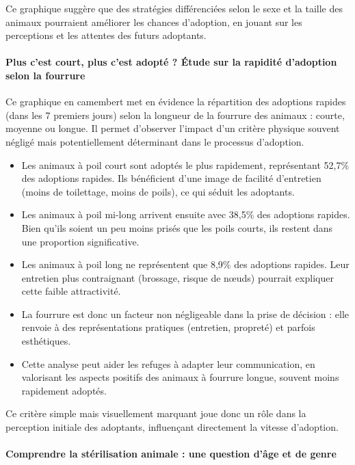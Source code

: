 \documentclass[a4paper,12pt]{article}
\begin{document}
Ce graphique suggère que des stratégies différenciées selon le sexe et la taille des animaux pourraient améliorer les chances d’adoption, en jouant sur les perceptions et les attentes des futurs adoptants.

\paragraph{ Plus c’est court, plus c’est adopté ? Étude sur la rapidité d’adoption selon la fourrure}

Ce graphique en camembert met en évidence la répartition des adoptions rapides (dans les 7 premiers jours) selon la longueur de la fourrure des animaux : courte, moyenne ou longue. Il permet d’observer l’impact d’un critère physique souvent négligé mais potentiellement déterminant dans le processus d’adoption.

\begin{itemize}
    \item Les animaux à poil court sont adoptés le plus rapidement, représentant 52{,}7\% des adoptions rapides. Ils bénéficient d’une image de facilité d’entretien (moins de toilettage, moins de poils), ce qui séduit les adoptants.
    \item Les animaux à poil mi-long arrivent ensuite avec 38{,}5\% des adoptions rapides. Bien qu’ils soient un peu moins prisés que les poils courts, ils restent dans une proportion significative.
    \item Les animaux à poil long ne représentent que 8{,}9\% des adoptions rapides. Leur entretien plus contraignant (brossage, risque de nœuds) pourrait expliquer cette faible attractivité.
    \item La fourrure est donc un facteur non négligeable dans la prise de décision : elle renvoie à des représentations pratiques (entretien, propreté) et parfois esthétiques.
    \item Cette analyse peut aider les refuges à adapter leur communication, en valorisant les aspects positifs des animaux à fourrure longue, souvent moins rapidement adoptés.
\end{itemize}

Ce critère simple mais visuellement marquant joue donc un rôle dans la perception initiale des adoptants, influençant directement la vitesse d’adoption.

\paragraph{Comprendre la stérilisation animale : une question d’âge et de genre}
\end{document}
